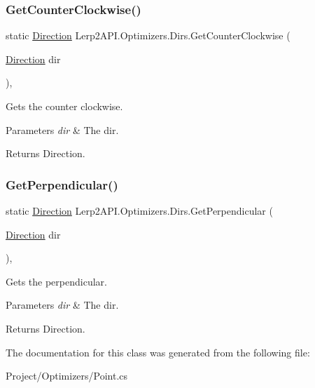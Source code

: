 \subsubsection{\texorpdfstring{Get\+Counter\+Clockwise()}{GetCounterClockwise()}}
{\footnotesize\ttfamily static \hyperlink{namespace_lerp2_a_p_i_1_1_optimizers_a159a6f85bec1076b8b34d5da86c7cafe}{Direction} Lerp2\+A\+P\+I.\+Optimizers.\+Dirs.\+Get\+Counter\+Clockwise (\begin{DoxyParamCaption}\item[{\hyperlink{namespace_lerp2_a_p_i_1_1_optimizers_a159a6f85bec1076b8b34d5da86c7cafe}{Direction}}]{dir }\end{DoxyParamCaption})\hspace{0.3cm}{\ttfamily [inline]}, {\ttfamily [static]}}



Gets the counter clockwise. 


\begin{DoxyParams}{Parameters}
{\em dir} & The dir.\\
\hline
\end{DoxyParams}
\begin{DoxyReturn}{Returns}
Direction.
\end{DoxyReturn}
\mbox{\label{class_lerp2_a_p_i_1_1_optimizers_1_1_dirs_ac5405654ae96ef91b434fd2d28c555c0}} 
\subsubsection{\texorpdfstring{Get\+Perpendicular()}{GetPerpendicular()}}
{\footnotesize\ttfamily static \hyperlink{namespace_lerp2_a_p_i_1_1_optimizers_a159a6f85bec1076b8b34d5da86c7cafe}{Direction} Lerp2\+A\+P\+I.\+Optimizers.\+Dirs.\+Get\+Perpendicular (\begin{DoxyParamCaption}\item[{\hyperlink{namespace_lerp2_a_p_i_1_1_optimizers_a159a6f85bec1076b8b34d5da86c7cafe}{Direction}}]{dir }\end{DoxyParamCaption})\hspace{0.3cm}{\ttfamily [inline]}, {\ttfamily [static]}}



Gets the perpendicular. 


\begin{DoxyParams}{Parameters}
{\em dir} & The dir.\\
\hline
\end{DoxyParams}
\begin{DoxyReturn}{Returns}
Direction.
\end{DoxyReturn}


The documentation for this class was generated from the following file\+:\begin{DoxyCompactItemize}
\item 
Project/\+Optimizers/Point.\+cs\end{DoxyCompactItemize}
